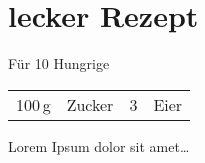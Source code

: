 \section{lecker Rezept}

F\"{u}r 10 Hungrige
\begin{table}[H]\label{tab:am_s_k}
  \centering
  \begin{tabular*}{1\textwidth}{rlrl}
    100\,g & Zucker  &3&Eier \\
  \end{tabular*}
\end{table}


Lorem Ipsum dolor sit amet\ldots




